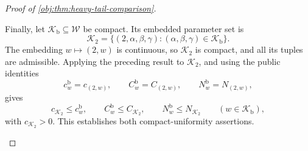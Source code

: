 \begin{proof}[Proof of \cref{obj:thm:heavy-tail-comparison}]
\begin{enumerate}
Finally, let \(\mathcal K_{\mathrm b}\subseteq\mathcal W\) be compact. Its embedded parameter set is
\[
\mathcal K_2
=\{(2,\alpha,\beta,\gamma):
(\alpha,\beta,\gamma)\in\mathcal K_{\mathrm b}\}.
\]
The embedding \(w\mapsto(2,w)\) is continuous, so \(\mathcal K_2\) is compact, and all its tuples are admissible. Applying the preceding result to \(\mathcal K_2\), and using the public identities
\[
c_w^{\mathrm b}=c_{(2,w)},
\qquad
C_w^{\mathrm b}=C_{(2,w)},
\qquad
N_w^{\mathrm b}=N_{(2,w)},
\]
gives
\[
c_{\mathcal K_2}\le c_w^{\mathrm b},
\qquad
C_w^{\mathrm b}\le C_{\mathcal K_2},
\qquad
N_w^{\mathrm b}\le N_{\mathcal K_2}
\qquad(w\in\mathcal K_{\mathrm b}),
\]
with \(c_{\mathcal K_2}>0\). This establishes both compact-uniformity assertions.
\end{enumerate}
\end{proof}

